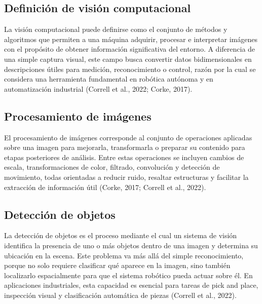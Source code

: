 \subsection{Definición de visión computacional}
La visión computacional puede definirse como el conjunto de métodos y algoritmos que permiten a una máquina adquirir, procesar e interpretar imágenes con el propósito de obtener información significativa del entorno. A diferencia de una simple captura visual, este campo busca convertir datos bidimensionales en descripciones útiles para medición, reconocimiento o control, razón por la cual se considera una herramienta fundamental en robótica autónoma y en automatización industrial (Correll et al., 2022; Corke, 2017).

\subsection{Procesamiento de imágenes}
El procesamiento de imágenes corresponde al conjunto de operaciones aplicadas sobre una imagen para mejorarla, transformarla o preparar su contenido para etapas posteriores de análisis. Entre estas operaciones se incluyen cambios de escala, transformaciones de color, filtrado, convolución y detección de movimiento, todas orientadas a reducir ruido, resaltar estructuras y facilitar la extracción de información útil (Corke, 2017; Correll et al., 2022).

\subsection{Detección de objetos}
La detección de objetos es el proceso mediante el cual un sistema de visión identifica la presencia de uno o más objetos dentro de una imagen y determina su ubicación en la escena. Este problema va más allá del simple reconocimiento, porque no solo requiere clasificar qué aparece en la imagen, sino también localizarlo espacialmente para que el sistema robótico pueda actuar sobre él. En aplicaciones industriales, esta capacidad es esencial para tareas de pick and place, inspección visual y clasificación automática de piezas (Correll et al., 2022).



